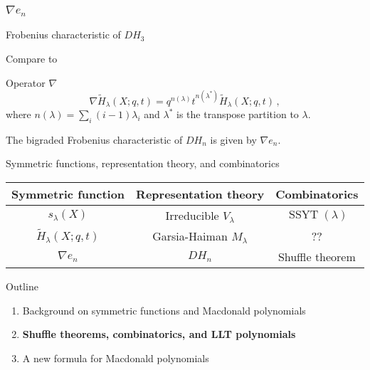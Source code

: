 \documentclass[dvipsnames]{beamer}
\newcommand{\Htild}{\tilde{H}}
\DeclareMathOperator{\SSYT}{SSYT}
\theoremstyle{definition}
\newcounter{c}
\begin{document}
\begin{frame}
  \frametitle{\(\nabla e_n\)}
  Frobenius characteristic of \(DH_3\)\pause
  \begin{center}
    \pause
\end{center}
Compare to  
\begin{center}
  \end{center}\pause
  \begin{block}{Operator \(\nabla\)}
    \[
      \nabla \tilde{H}_\lambda(X;q,t) = q^{n(\lambda)} t^{n(\lambda^*)} \tilde{H}_\lambda(X;q,t)\,,
    \]
    where $n(\lambda) = \sum _{i} (i-1)\lambda_{i}$ and \(\lambda^*\)
    is the transpose partition to \(\lambda\).
  \end{block}\pause
  \begin{theorem}[Haiman, 2002]
    The bigraded Frobenius characteristic of \(DH_n\) is given by \(\nabla e_n\).
  \end{theorem}
\end{frame}
  \begin{frame}{Symmetric functions, representation theory, and combinatorics}
    \begin{tabular}{ccc}
      Symmetric function & Representation theory & Combinatorics 
      \\
      \hline
      \(s_\lambda(X)\) & Irreducible \(V_\lambda\) & \(\SSYT(\lambda)\) \\
      \(\Htild_\lambda(X;q,t)\) & Garsia-Haiman \(M_\lambda\) & ?? \\
      \(\nabla e_n\) & \(DH_n\) & Shuffle theorem
    \end{tabular}
  \end{frame}
\begin{frame}{Outline}
  \begin{enumerate}
  \item Background on symmetric functions and Macdonald polynomials
  \item {\bf Shuffle theorems, combinatorics, and LLT polynomials}
  \item A new formula for Macdonald polynomials
  \end{enumerate}
\end{frame}
\end{document}
